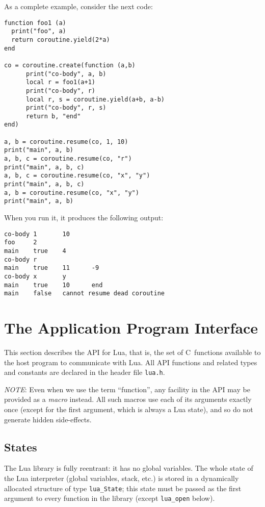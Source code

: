 \documentclass[11pt,twoside]{article}
\makeatletter
\newcommand{\DefAPI}[1]{\index{C API!#1@{\tt #1}}}
\newcommand{\NOTE}{\par\medskip\noindent\emph{NOTE}: }
\makeatother
\begin{document}
As a complete example,
consider the next code:
\begin{verbatim}
function foo1 (a)
  print("foo", a)
  return coroutine.yield(2*a)
end

co = coroutine.create(function (a,b)
      print("co-body", a, b)
      local r = foo1(a+1)
      print("co-body", r)
      local r, s = coroutine.yield(a+b, a-b)
      print("co-body", r, s)
      return b, "end"
end)
       
a, b = coroutine.resume(co, 1, 10)
print("main", a, b)
a, b, c = coroutine.resume(co, "r")
print("main", a, b, c)
a, b, c = coroutine.resume(co, "x", "y")
print("main", a, b, c)
a, b = coroutine.resume(co, "x", "y")
print("main", a, b)
\end{verbatim}
When you run it, it produces the following output:
\begin{verbatim}
co-body 1       10
foo     2
main    true    4
co-body r
main    true    11      -9
co-body x       y
main    true    10      end
main    false   cannot resume dead coroutine
\end{verbatim}



\section{The Application Program Interface}\label{API}

This section describes the API for Lua, that is,
the set of C~functions available to the host program to communicate
with Lua.
All API functions and related types and constants
are declared in the header file \verb|lua.h|.

\NOTE
Even when we use the term ``function'',
any facility in the API may be provided as a \emph{macro} instead.
All such macros use each of its arguments exactly once
(except for the first argument, which is always a Lua state),
and so do not generate hidden side-effects.


\subsection{States} \label{mangstate}

The Lua library is fully reentrant:
it has no global variables.
The whole state of the Lua interpreter
(global variables, stack, etc.)
is stored in a dynamically allocated structure of type \verb|lua_State|;
\DefAPI{lua_State}
this state must be passed as the first argument to
every function in the library (except \verb|lua_open| below).
\end{document}
